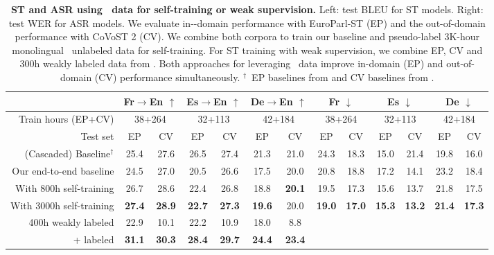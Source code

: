 \begin{table*}[t]
    \centering
    \small
    \begin{tabular}{r|cc|cc|cc||cc|cc|cc}
    \toprule
     & \multicolumn{2}{c|}{Fr$\rightarrow$En $\uparrow$} & \multicolumn{2}{c|}{Es$\rightarrow$En $\uparrow$} & \multicolumn{2}{c||}{De$\rightarrow$En $\uparrow$} & \multicolumn{2}{c|}{Fr $\downarrow$} & \multicolumn{2}{c|}{Es $\downarrow$} & \multicolumn{2}{c}{De $\downarrow$}  \\
     \midrule
     Train hours (EP+CV) & \multicolumn{2}{c|}{38+264} & \multicolumn{2}{c|}{32+113} & \multicolumn{2}{c||}{42+184} & \multicolumn{2}{c|}{38+264} & \multicolumn{2}{c|}{32+113} & \multicolumn{2}{c}{42+184} \\
     Test set & EP & CV & EP & CV & EP & CV & EP & CV & EP & CV & EP & CV \\
    \midrule
    (Cascaded) Baseline$^{\dagger}$ & 25.4 & 27.6 & 26.5 & 27.4 & 21.3 & 21.0 & 24.3 & 18.3 & 15.0 & 21.4 & 19.8 & 16.0 \\
    Our end-to-end baseline & 24.5 & 27.0 & 20.5 & 26.6 & 17.5 & 20.0 & 20.8 & 18.8 & 17.2 & 14.1 & 23.2 & 18.4 \\
    With 800h self-training & 26.7 & 28.6 & 22.4 & 26.8 & 18.8 & \textbf{20.1} & 19.5 & 17.3 & 15.6 & 13.7 & 21.8 & 17.5 \\
    With 3000h self-training & \textbf{27.4} & \textbf{28.9} & \textbf{22.7} & \textbf{27.3} & \textbf{19.6} & 20.0 & \textbf{19.0} & \textbf{17.0} & \textbf{15.3} & \textbf{13.2} & \textbf{21.4} & \textbf{17.3} \\
    \midrule
    400h weakly labeled & 22.9 & 10.1 & 22.2 & 10.9 & 18.0 & 8.8 & \\
    + labeled & \textbf{31.1} & \textbf{30.3} & \textbf{28.4} & \textbf{29.7} & \textbf{24.4} & \textbf{23.4} & \\
    \bottomrule
    \end{tabular}
    \caption{\textbf{ST and ASR using \vp~data for self-training or weak supervision.} Left: test BLEU for ST models. Right: test WER for ASR models. We evaluate in-\vp-domain performance with EuroParl-ST (EP) and the out-of-domain performance with CoVoST 2 (CV). We combine both corpora to train our baseline and pseudo-label 3K-hour monolingual \vp~unlabeled data for self-training.
    For ST training with weak supervision, we combine EP, CV and 300h weakly labeled data from \vp. Both approaches for leveraging \vp~data improve in-domain (EP) and out-of-domain (CV) performance simultaneously. $^\dagger$~EP baselines from \citet{iranzo2020europarl} and CV baselines from \citet{wang2020covost}.}
    \label{tab:st_self_training_eval}
\end{table*}
